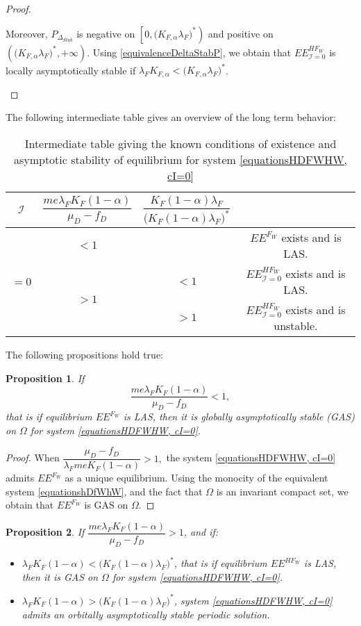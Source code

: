 \documentclass{article}
\newcommand{\lfw}{\lambda_{F}}
\newcommand{\lfw}{\lambda_{F}}
\newcommand{\Kfa}{K_{F,\alpha}}
\newcommand{\cI}{\mathcal{I}}
\newtheorem{prop}{Proposition}
\begin{document}
\begin{proof}
\begin{itemize}
Moreover, $P_{\Delta_{Stab}}$ is negative on $\left[0, \Big(\Kfa \lfw \Big)^* \right)$ and positive on $\left(\Big(\Kfa \lfw \Big)^*, +\infty \right)$. Using \eqref{equivalenceDeltaStabP}, we obtain that $EE^{HF_W}_{\cI = 0}$ is locally asymptotically stable if $\lfw \Kfa < \Big(\Kfa \lfw \Big)^*$.

\end{itemize}
\end{proof}


The following intermediate table gives an overview of the long term behavior:

\begin{table}[!ht]
\centering
\def\arraystretch{2}
\begin{tabular}{c|c|c|c}
$\cI$ & $\dfrac{m e\lfw K_F(1-\alpha)}{\mu_D - f_D}$ &  $\dfrac{K_F(1-\alpha) \lfw}{\Big(K_F(1-\alpha) \lfw \Big)^*}$ & \\
\hline
  \multirow{3}{*}{$=0$}  & $ < 1$ & &$EE^{F_W}$ exists and is LAS. \\
   \cline{2-4}
& \multirow{2}{*}{$ > 1$} & $<1$ &$EE^{HF_W}_{\cI=0}$ exists and is LAS.\\
 \cline{3-4}
 & & $>1$ &$EE^{HF_W}_{\cI=0}$ exists and is unstable. 
\end{tabular}
\caption{\centering Intermediate table giving the known conditions of existence and asymptotic stability of equilibrium for system \eqref{equationsHDFWHW, cI=0}}
\end{table}

The following propositions hold true:

\begin{prop}\label{propEEFGAS}If 
$$
\dfrac{m e \lfw K_F(1-\alpha)}{\mu_D - f_D} < 1,
$$
that is if equilibrium $EE^{F_W}$ is LAS, then it is globally asymptotically stable (GAS) on $\Omega$ for system \eqref{equationsHDFWHW, cI=0}.
\end{prop}

\begin{proof}
When $\dfrac{\mu_D - f_D}{\lfw m e K_F(1-\alpha)} >1,$ the system \eqref{equationsHDFWHW, cI=0} admits $EE^{F_W}$ as a unique equilibrium. Using the monocity of the equivalent system \eqref{equationshDfWhW}, and the fact that $\Omega$ is an invariant compact set, we obtain that $EE^{F_W}$ is GAS on $\Omega$.
\end{proof}


\begin{prop}\label{LimitCycle, cI=0}
If $\dfrac{m e \lfw K_F(1-\alpha)}{\mu_D - f_D} > 1$, and if:
\begin{itemize}
\item $\lfw K_F(1-\alpha) < \Big(K_F(1-\alpha) \lfw \Big)^*$, that is if equilibrium $EE^{HF_W}$ is LAS, then it is GAS on $\Omega$ for system \eqref{equationsHDFWHW, cI=0}.
\item $\lfw K_F(1-\alpha) > \Big(K_F(1-\alpha) \lfw \Big)^*$, system \eqref{equationsHDFWHW, cI=0} admits an orbitally asymptotically stable periodic solution.
\end{itemize}
\end{prop}
\end{document}
